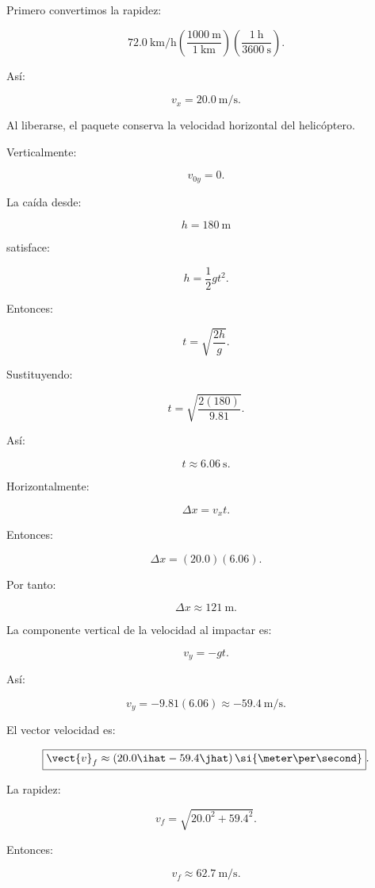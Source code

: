 \begin{explicacion}
Primero convertimos la rapidez:

\[
\SI{72.0}{\kilo\meter\per\hour}
\left(
\frac{\SI{1000}{\meter}}{\SI{1}{\kilo\meter}}
\right)
\left(
\frac{\SI{1}{\hour}}{\SI{3600}{\second}}
\right).
\]

Así:

\[
\boxed{
v_x=\SI{20.0}{\meter\per\second}
}.
\]

Al liberarse, el paquete conserva la velocidad horizontal del helicóptero.

Verticalmente:

\[
v_{0y}=0.
\]

La caída desde:

\[
h=\SI{180}{\meter}
\]

satisface:

\[
h=\frac{1}{2}gt^2.
\]

Entonces:

\[
t
=
\sqrt{
\frac{2h}{g}
}.
\]

Sustituyendo:

\[
t
=
\sqrt{
\frac{2(180)}{9.81}
}.
\]

Así:

\[
\boxed{
t\approx\SI{6.06}{\second}
}.
\]

Horizontalmente:

\[
\Delta x=v_xt.
\]

Entonces:

\[
\Delta x
=
(20.0)(6.06).
\]

Por tanto:

\[
\boxed{
\Delta x\approx\SI{121}{\meter}
}.
\]

La componente vertical de la velocidad al impactar es:

\[
v_y=-gt.
\]

Así:

\[
v_y
=
-9.81(6.06)
\approx
-\SI{59.4}{\meter\per\second}.
\]

El vector velocidad es:

\[
\boxed{
\vect{v}_f
\approx
(20.0\ihat-59.4\jhat)
\,\si{\meter\per\second}
}.
\]

La rapidez:

\[
v_f
=
\sqrt{
20.0^2+59.4^2
}.
\]

Entonces:

\[
\boxed{
v_f\approx\SI{62.7}{\meter\per\second}
}.
\]
\end{explicacion}



